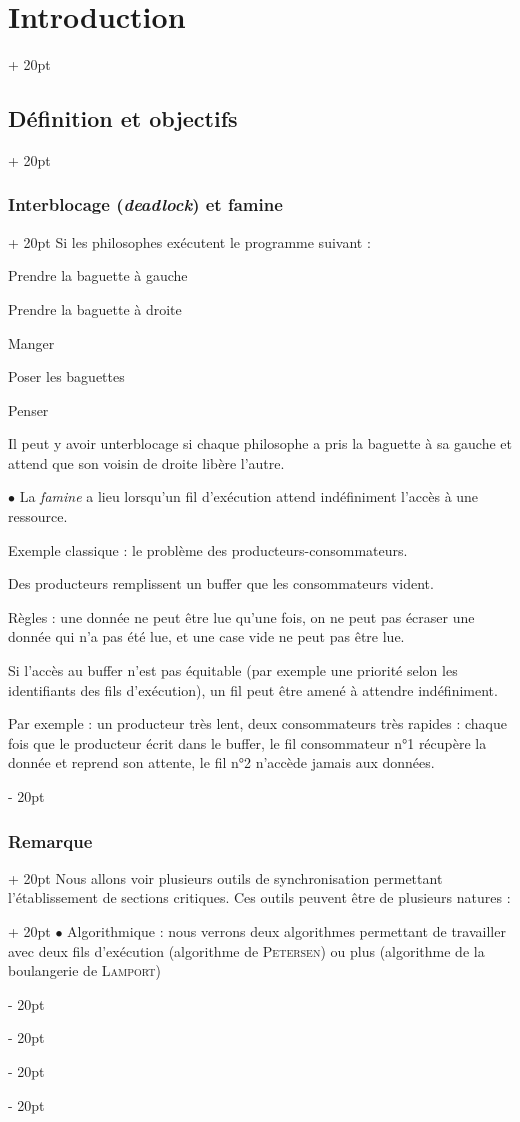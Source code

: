 \documentclass[a4paper, 12pt, twoside]{article}
\newcommand{\ind}[1][20pt]{\advance\leftskip + #1}
\newcommand{\deind}[1][20pt]{\advance\leftskip - #1}
\newenvironment{indt}[2][20pt]{#2 \par \ind[#1]}{\par \deind} %
\begin{document}
\begin{indt}{\section{Introduction}}
\begin{indt}{\subsection{Définition et objectifs}}
\begin{indt}{\subsubsection{Interblocage (\textit{deadlock}) et famine}}
                Si les philosophes exécutent le programme suivant :

                \begin{pseudocode}
                    Prendre la baguette à gauche

                    Prendre la baguette à droite

                    Manger

                    Poser les baguettes

                    Penser
                \end{pseudocode}

                Il peut y avoir unterblocage si chaque philosophe a pris la baguette à sa gauche et attend que son voisin de droite libère l'autre.

                \vspace{6pt}
                
                $\bullet$ La \textit{famine} a lieu lorsqu'un fil d'exécution attend indéfiniment l'accès à une ressource.

                Exemple classique : le problème des producteurs-consommateurs.

                Des producteurs remplissent un buffer que les consommateurs vident.

                Règles : une donnée ne peut être lue qu'une fois, on ne peut pas écraser une donnée qui n'a pas été lue, et une case vide ne peut pas être lue.

                Si l'accès au buffer n'est pas équitable (par exemple une priorité selon les identifiants des fils d'exécution), un fil peut être amené à attendre indéfiniment.

                Par exemple : un producteur très lent, deux consommateurs très rapides : chaque fois que le producteur écrit dans le buffer, le fil consommateur n°1 récupère la donnée et reprend son attente, le fil n°2 n'accède jamais aux données.
            \end{indt}

            \vspace{12pt}
            
            \begin{indt}{\subsubsection{Remarque}}
                Nous allons voir plusieurs outils de synchronisation permettant l'établissement de sections critiques.
                \begin{indt}{Ces outils peuvent être de plusieurs natures :}
                    $\bullet$ Algorithmique : nous verrons deux algorithmes permettant de travailler avec deux fils d'exécution (algorithme de \textsc{Petersen}) ou plus (algorithme de la boulangerie de \textsc{Lamport})


\end{indt}
\end{indt}
\end{indt}
\end{indt}
\end{document}

